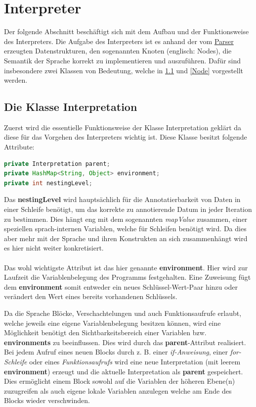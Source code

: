 \section{Interpreter}
\label{InterpreterIntro}
Der folgende Abschnitt beschäftigt sich mit dem Aufbau und der Funktionsweise des Interpreters. Die Aufgabe des Interpreters ist es anhand der vom \underline{Parser} erzeugten Datenstrukturen, den sogenannten Knoten (englisch: Nodes), die Semantik der Sprache korrekt zu implementieren und auszuführen. Dafür sind insbesondere zwei Klassen von Bedeutung, welche in \ref{Interpretation} und \ref{Node} vorgestellt werden.

\subsection{Die Klasse Interpretation}
\label{Interpretation}
Zuerst wird die essentielle Funktionsweise der Klasse Interpretation geklärt da diese für das Vorgehen des Interpreters wichtig ist.
Diese Klasse besitzt folgende Attribute:

\begin{lstlisting}[caption=Attribute der Klasse Interpretation, language=Java]
private Interpretation parent;
private HashMap<String, Object> environment;
private int nestingLevel;
\end{lstlisting}
Das \textbf{nestingLevel} wird hauptsächlich für die Annotatierbarkeit von Daten in einer Schleife benötigt, um das korrekte zu annotierende Datum in jeder Iteration zu bestimmen. Dies hängt eng mit dem sogenannten \textit{mapValue} zusammen, einer speziellen sprach-internen Variablen, welche für Schleifen benötigt wird. Da dies aber mehr mit der Sprache und ihren Konstrukten an sich zusammenhängt wird es hier nicht weiter konkretisiert.
\\\\
Das wohl wichtigste Attribut ist das hier genannte \textbf{environment}. Hier wird zur Laufzeit die Variablenbelegung des Programms festgehalten. Eine Zuweisung fügt dem \textbf{environment} somit entweder ein neues Schlüssel-Wert-Paar hinzu oder verändert den Wert eines bereits vorhandenen Schlüssels.

Da die Sprache Blöcke, Verschachtelungen und auch Funktionsaufrufe erlaubt, welche jeweils eine eigene Variablenbelegung besitzen können, wird eine Möglichkeit benötigt den Sichtbarkeitsbereich einer Variablen bzw. \textbf{environments}  zu beeinflussen. Dies wird durch das \textbf{parent}-Attribut realisiert. Bei jedem Aufruf eines neuen Blocks durch z. B. einer \textit{if-Anweisung}, einer \textit{for-Schleife} oder eines \textit{Funktionsaufrufs} wird eine neue Interpretation (mit leerem \textbf{environment}) erzeugt und die aktuelle Interpretation als \textbf{parent} gespeichert. Dies ermöglicht einem Block sowohl auf die Variablen der höheren Ebene(n) zuzugreifen als auch eigene lokale Variablen anzulegen welche am Ende des Blocks wieder verschwinden. 


